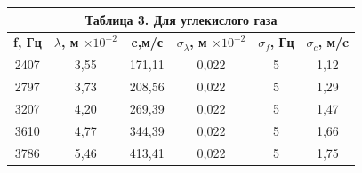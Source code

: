 \documentclass[11pt,a4paper,oneside]{article}
\begin{document}
\begin{enumerate}
\begin{table}[h!]
\begin{center}
\begin{tabular}{cccccc}
\multicolumn{6}{c}{\textbf{Таблица 3. Для углекислого газа}}                                                                                                                                                                                                                                                     \\ \hline
\multicolumn{1}{|c|}{\textbf{f, Гц}} & \multicolumn{1}{c|}{\textbf{$\lambda$, м $\times 10^{-2}$}} & \multicolumn{1}{c|}{\textbf{c,м/с}} & \multicolumn{1}{c|}{\textbf{$\sigma_{\lambda}$, м $\times 10^{-2}$}} & \multicolumn{1}{c|}{\textbf{$\sigma_{f}$, Гц}} & \multicolumn{1}{c|}{\textbf{$\sigma_{c}$, м/c}} \\ \hline
\multicolumn{1}{|c|}{2407}           & \multicolumn{1}{c|}{3,55}                                   & \multicolumn{1}{c|}{171,11}         & \multicolumn{1}{c|}{0,022}                                          & \multicolumn{1}{c|}{5}                         & \multicolumn{1}{c|}{1,12}                       \\ \hline
\multicolumn{1}{|c|}{2797}           & \multicolumn{1}{c|}{3,73}                                   & \multicolumn{1}{c|}{208,56}         & \multicolumn{1}{c|}{0,022}                                          & \multicolumn{1}{c|}{5}                         & \multicolumn{1}{c|}{1,29}                       \\ \hline
\multicolumn{1}{|c|}{3207}           & \multicolumn{1}{c|}{4,20}                                   & \multicolumn{1}{c|}{269,39}         & \multicolumn{1}{c|}{0,022}                                          & \multicolumn{1}{c|}{5}                         & \multicolumn{1}{c|}{1,47}                       \\ \hline
\multicolumn{1}{|c|}{3610}           & \multicolumn{1}{c|}{4,77}                                   & \multicolumn{1}{c|}{344,39}         & \multicolumn{1}{c|}{0,022}                                          & \multicolumn{1}{c|}{5}                         & \multicolumn{1}{c|}{1,66}                       \\ \hline
\multicolumn{1}{|c|}{3786}           & \multicolumn{1}{c|}{5,46}                                   & \multicolumn{1}{c|}{413,41}         & \multicolumn{1}{c|}{0,022}                                          & \multicolumn{1}{c|}{5}                         & \multicolumn{1}{c|}{1,75}                       \\ \hline
\end{tabular}
\end{center}
\end{table}


\end{enumerate}
\end{document}
